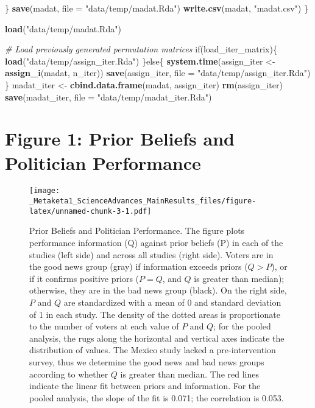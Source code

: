 \documentclass[]{article}
\newenvironment{Shaded}{\begin{snugshade}}{\end{snugshade}}
\newcommand{\KeywordTok}[1]{\textcolor[rgb]{0.13,0.29,0.53}{\textbf{{#1}}}}
\newcommand{\DataTypeTok}[1]{\textcolor[rgb]{0.13,0.29,0.53}{{#1}}}
\newcommand{\StringTok}[1]{\textcolor[rgb]{0.31,0.60,0.02}{{#1}}}
\newcommand{\CommentTok}[1]{\textcolor[rgb]{0.56,0.35,0.01}{\textit{{#1}}}}
\newcommand{\NormalTok}[1]{{#1}}
\begin{document}
\begin{Shaded}
\begin{Highlighting}[]
  \NormalTok{\}}
  \KeywordTok{save}\NormalTok{(madat, }\DataTypeTok{file =} \StringTok{"data/temp/madat.Rda"}\NormalTok{)}
  \KeywordTok{write.csv}\NormalTok{(madat, }\StringTok{"madat.csv"}\NormalTok{)}
\NormalTok{\}}

\KeywordTok{load}\NormalTok{(}\StringTok{"data/temp/madat.Rda"}\NormalTok{)}
 
\CommentTok{# Load previously generated permutation matrices}
\NormalTok{if(load_iter_matrix)\{}
  \KeywordTok{load}\NormalTok{(}\StringTok{"data/temp/assign_iter.Rda"}\NormalTok{)}
\NormalTok{\}else\{}
  \KeywordTok{system.time}\NormalTok{(assign_iter <-}\StringTok{ }\KeywordTok{assign_i}\NormalTok{(madat, n_iter))}
  \KeywordTok{save}\NormalTok{(assign_iter, }\DataTypeTok{file =} \StringTok{"data/temp/assign_iter.Rda"}\NormalTok{)}
\NormalTok{\}}
  \NormalTok{madat_iter <-}\StringTok{ }\KeywordTok{cbind.data.frame}\NormalTok{(madat, assign_iter)}
  \KeywordTok{rm}\NormalTok{(assign_iter)}
  \KeywordTok{save}\NormalTok{(madat_iter, }\DataTypeTok{file =} \StringTok{"data/temp/madat_iter.Rda"}\NormalTok{)}
\end{Highlighting}
\end{Shaded}

\section{Figure 1: Prior Beliefs and Politician
Performance}\label{figure-1-prior-beliefs-and-politician-performance}

\begin{figure}[htbp]
\centering
\texttt{[image: \_Metaketa1\_ScienceAdvances\_MainResults\_files/figure-latex/unnamed-chunk-3-1.pdf]}
\caption{Prior Beliefs and Politician Performance. The figure plots
performance information (Q) against prior beliefs (P) in each of the
studies (left side) and across all studies (right side). Voters are in
the good news group (gray) if information exceeds priors (\(Q>P\)), or
if it confirms positive priors (\(P=Q\), and \(Q\) is greater than
median); otherwise, they are in the bad news group (black). On the right
side, \(P\) and \(Q\) are standardized with a mean of 0 and standard
deviation of 1 in each study. The density of the dotted areas is
proportionate to the number of voters at each value of \(P\) and \(Q\);
for the pooled analysis, the rugs along the horizontal and vertical axes
indicate the distribution of values. The Mexico study lacked a
pre-intervention survey, thus we determine the good news and bad news
groups according to whether \(Q\) is greater than median. The red lines
indicate the linear fit between priors and information. For the pooled
analysis, the slope of the fit is 0.071; the correlation is 0.053.}
\end{figure}
\end{document}

